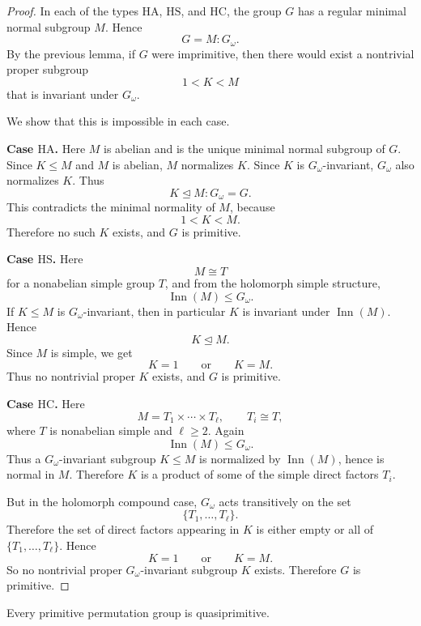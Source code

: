 \begin{proof}
In each of the types \(\mathrm{HA}\), \(\mathrm{HS}\), and \(\mathrm{HC}\), the group
\(G\) has a regular minimal normal subgroup \(M\). Hence
\[
    G=M:G_\omega.
\]
By the previous lemma, if \(G\) were imprimitive, then there would exist a
nontrivial proper subgroup
\[
    1<K<M
\]
that is invariant under \(G_\omega\).

We show that this is impossible in each case.

\medskip

\noindent
\textbf{Case \(\mathrm{HA}\).}
Here \(M\) is abelian and is the unique minimal normal subgroup of \(G\). Since
\(K\leq M\) and \(M\) is abelian, \(M\) normalizes \(K\). Since \(K\) is
\(G_\omega\)-invariant, \(G_\omega\) also normalizes \(K\). Thus
\[
    K\unlhd M:G_\omega=G.
\]
This contradicts the minimal normality of \(M\), because
\[
    1<K<M.
\]
Therefore no such \(K\) exists, and \(G\) is primitive.

\medskip

\noindent
\textbf{Case \(\mathrm{HS}\).}
Here
\[
    M\cong T
\]
for a nonabelian simple group \(T\), and from the holomorph simple structure,
\[
    \operatorname{Inn}(M)\leq G_\omega.
\]
If \(K\leq M\) is \(G_\omega\)-invariant, then in particular \(K\) is invariant
under \(\operatorname{Inn}(M)\). Hence
\[
    K\unlhd M.
\]
Since \(M\) is simple, we get
\[
    K=1
    \qquad
    \text{or}
    \qquad
    K=M.
\]
Thus no nontrivial proper \(K\) exists, and \(G\) is primitive.

\medskip

\noindent
\textbf{Case \(\mathrm{HC}\).}
Here
\[
    M=T_1\times \cdots \times T_\ell,
    \qquad
    T_i\cong T,
\]
where \(T\) is nonabelian simple and \(\ell\geq 2\). Again
\[
    \operatorname{Inn}(M)\leq G_\omega.
\]
Thus a \(G_\omega\)-invariant subgroup \(K\leq M\) is normalized by
\(\operatorname{Inn}(M)\), hence is normal in \(M\). Therefore \(K\) is a product
of some of the simple direct factors \(T_i\).

But in the holomorph compound case, \(G_\omega\) acts transitively on the set
\[
    \{T_1,\dots,T_\ell\}.
\]
Therefore the set of direct factors appearing in \(K\) is either empty or all of
\(\{T_1,\dots,T_\ell\}\). Hence
\[
    K=1
    \qquad
    \text{or}
    \qquad
    K=M.
\]
So no nontrivial proper \(G_\omega\)-invariant subgroup \(K\) exists. Therefore
\(G\) is primitive.
\end{proof}

\begin{proposition}
Every primitive permutation group is quasiprimitive.
\end{proposition}

